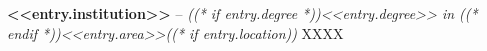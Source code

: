 \textbf{<<entry.institution>>} -- \textit{((* if entry.degree *))<<entry.degree>> in ((* endif *))<<entry.area>>((* if entry.location))} \hfill XXXX